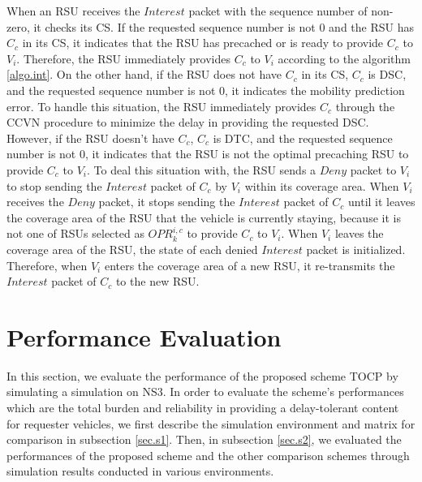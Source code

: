 \documentclass{ieeeaccess}
\begin{document}
When an RSU receives the $Interest$ packet with the sequence number of non-zero, it checks its CS.
If the requested sequence number is not 0 and the RSU has $C_{c}$ in its CS, it indicates that the RSU has precached or is ready to provide $C_{c}$ to $V_{i}$.
Therefore, the RSU immediately provides $C_{c}$ to $V_{i}$ according to the algorithm \ref{algo.int}.
On the other hand, if the RSU does not have $C_{c}$ in its CS, $C_{c}$ is DSC, and the requested sequence number is not 0, it indicates the mobility prediction error.
To handle this situation, the RSU immediately provides $C_{c}$ through the CCVN procedure to minimize the delay in providing the requested DSC.
However, if the RSU doesn't have $C_{c}$, $C_{c}$ is DTC, and the requested sequence number is not 0, it indicates that the RSU is not the optimal precaching RSU to provide $C_{c}$ to $V_{i}$.
To deal this situation with, the RSU sends a $Deny$ packet to $V_{i}$ to stop sending the $Interest$ packet of $C_{c}$ by $V_{i}$ within its coverage area.
When $V_{i}$ receives the $Deny$ packet, it stops sending the $Interest$ packet of $C_{c}$ until it leaves the coverage area of the RSU that the vehicle is currently staying, because it is not one of RSUs selected as $OPR^{i,c}_{k}$ to provide $C_{c}$ to $V_{i}$.
When $V_{i}$ leaves the coverage area of the RSU, the state of each denied $Interest$ packet is initialized.
Therefore, when $V_{i}$ enters the coverage area of a new RSU, it re-transmits the $Interest$ packet of $C_{c}$ to the new RSU.


\section{Performance Evaluation} \label{sec.s}
In this section, we evaluate the performance of the proposed scheme TOCP by simulating a simulation on NS3.
In order to evaluate the scheme's performances which are the total burden and reliability in providing a delay-tolerant content for requester vehicles, we first describe the simulation environment and matrix for comparison in subsection \ref{sec.s1}.
Then, in subsection \ref{sec.s2}, we evaluated the performances of the proposed scheme and the other comparison schemes through simulation results conducted in various environments.
\end{document}
